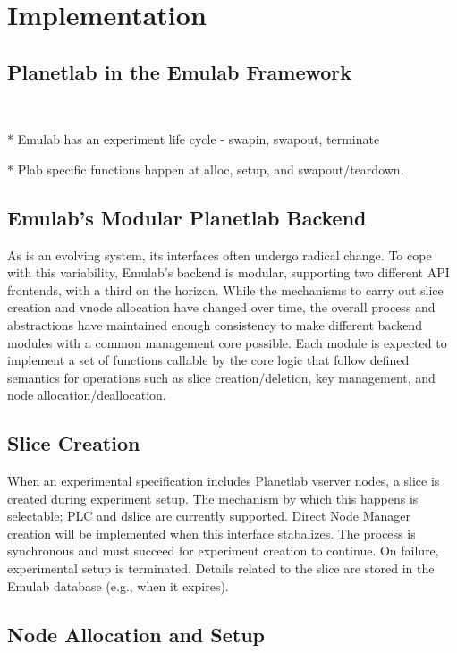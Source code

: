 \section{Implementation}
\label{impl}

\subsection{Planetlab in the Emulab Framework}

~

* Emulab has an experiment life cycle
  - swapin, swapout, terminate

* Plab specific functions happen at alloc, setup, and swapout/teardown.

\subsection{Emulab's Modular Planetlab Backend}

As \plab is an evolving system, its interfaces often undergo radical
change.  To cope with this variability, Emulab's \plab backend is
modular, supporting two different \plab API frontends, with a third on
the horizon.  While the mechanisms to carry out slice creation and
vnode allocation have changed over time, the overall process and
abstractions have maintained enough consistency to make different
backend modules with a common management core possible.  Each module
is expected to implement a set of functions callable by the core logic
that follow defined semantics for operations such as slice
creation/deletion, key management, and node allocation/deallocation.

\subsection{Slice Creation}

When an experimental specification includes Planetlab vserver nodes, a
slice is created during experiment setup.  The mechanism by which this
happens is selectable; PLC and dslice are currently supported.  Direct
Node Manager creation will be implemented when this interface stabalizes.  
The process is synchronous and must succeed for experiment creation to
continue.  On failure, experimental setup is terminated.  Details related 
to the slice are stored in the Emulab database (e.g., when it
expires).

\subsection{Node Allocation and Setup}

